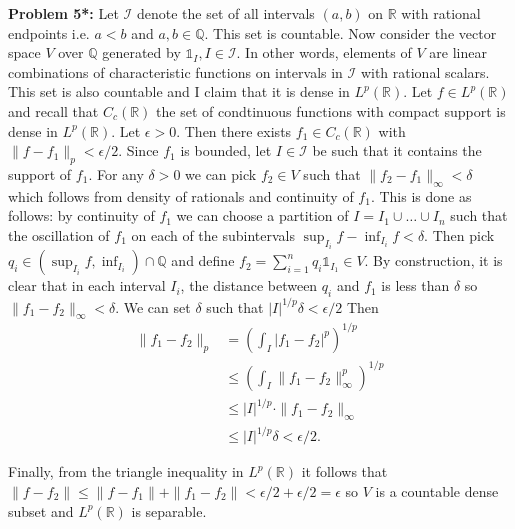 \documentclass[12pt]{amsart} %
\def\Q{\mathbb{Q}}
\def\R{\mathbb{R}}
\def\1{\mathbb{1}}
\begin{document}
\bigskip
\noindent
\textbf{Problem 5*:} Let $\mathcal{I}$ denote the set of all intervals $(a,b)$ on  $\R$ with rational endpoints i.e. $a<b$ and  $a,b \in \Q$. This set is countable. Now consider the vector space $V$ over $\Q$  generated by $\1_I, I \in \mathcal{I}$. In other words, elements of  $V$ are linear combinations of characteristic functions on intervals in  $\mathcal{I}$ with rational scalars. This set is also countable and I claim that it is dense in $L^p(\R)$. Let $f \in L^p(\R)$ and recall that $C_c\left( \R \right)$ the set of condtinuous functions with compact support is dense in $L^p(\R)$.  Let $\epsilon > 0$. Then there exists $f_1 \in C_c\left( \R \right)$ with $\|f - f_1\|_p < \epsilon/2$. Since $f_1$ is bounded,  let $I \in \mathcal{I}$ be such that it contains the support of $f_1$. For any $\delta > 0$ we can pick  $f_2 \in V$ such that $\|f_2 - f_1\|_\infty < \delta$ which follows from density of rationals and continuity of $f_1$. This is done as follows: by continuity of $f_1$ we can choose a partition of  $I= I_1 \cup \ldots\cup I_n$ such that the oscillation of $f_1$ on each  of the subintervals $\sup_{I_i}f - \inf_{I_i}f < \delta$. Then pick $q_i \in (\sup_{I_i}f , \inf_{I_i}) \cap \Q$ and define $f_2 = \sum_{i=1}^{n} q_i \1_{I_1} \in V$. By construction, it is clear that in each interval $I_i$, the distance between  $q_i$ and  $f_1$ is less than  $\delta$ so $\|f_1 - f_2\|_\infty < \delta$. We can set $\delta$ such that $|I|^{1/p}\delta < \epsilon/2$ Then 
\begin{align*}
	\|f_1 - f_2\|_p &= \left( \int_I |f_1 - f_2|^p \right) ^{1/p} \\
			&\le  \left( \int_I \|f_1 - f_2\|_\infty^p \right) ^{1/p} \\
			& \le |I|^{1/p}\cdot \|f_1 - f_2\|_\infty \\
			& \le  |I|^{1/p}\delta < \epsilon/2.
\end{align*}

Finally, from the triangle inequality in $L^p\left( \R \right) $ it follows that $\|f - f_2\|\le \|f-f_1\| +  \|f_1 - f_2\| < \epsilon/2 + \epsilon/2 = \epsilon$ so $V$ is a countable dense subset and  $L^p(\R)$ is separable. 
   






\vfill 
 
\end{document}
